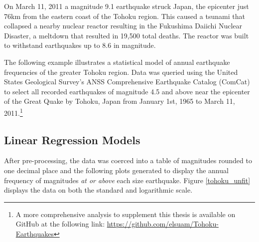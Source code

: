 
On March 11, 2011 a magnitude 9.1 earthquake struck Japan, the epicenter just 76km from the eastern coast of the Tohoku region.  This caused a tsunami that collapsed a nearby nuclear reactor resulting in the Fukushima Daiichi Nuclear Disaster, a meltdown that resulted in 19,500 total deaths.  The reactor was built to withstand earthquakes up to 8.6 in magnitude.

The following example illustrates a statistical model of annual earthquake frequencies of the greater Tohoku region.
Data was queried using the United States Geological Survey's ANSS Comprehensive Earthquake Catalog (ComCat)
to select all recorded earthquakes of magnitude 4.5 and above near the epicenter of the Great Quake by Tohoku, Japan from January 1st, 1965 to March 11, 2011.\footnote{A more comprehensive analysis to supplement this thesis is available on GitHub at the following link: 
\url{https://github.com/elsuam/Tohoku-Earthquakes}}

\subsection{Linear Regression Models}

After pre-processing, the data was coerced into a table of magnitudes rounded to one decimal place and the following plots generated to display the annual frequency of magnitudes \textit{at or above} each size earthquake.  Figure \ref{tohoku_unfit} displays the data on both the standard and logarithmic scale.

